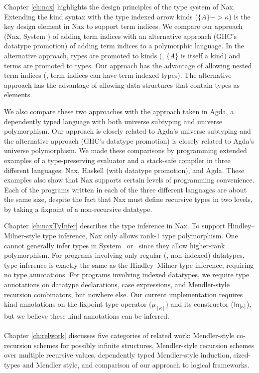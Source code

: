 Chapter \ref{ch:nax} highlights the design principles of the type system of Nax.
Extending the kind syntax with the type indexed arrow kinds ($\{A\} -> \kappa$) 
is the key design element in Nax to support term indices.
We compare our approach (Nax, System \Fi) of adding term indices with
an alternative approach (GHC's datatype promotion) of adding
term indices to a polymorphic language. In the alternative approach,
types are promoted to kinds (\ie, $\{A\}$ is itself a kind) and
terms are promoted to types. Our approach has the advantage of
allowing nested term indices (\ie, term indices can have term-indexed types).
The alternative approach has the advantage of allowing data structures that
contain types as elements.

We also compare these two approaches with the approach taken in Agda,
a dependently typed language with both universe subtyping and
universe polymorphism. Our approach is closely related to
Agda's universe subtyping and the alternative approach
(GHC's datatype promotion) is closely related to Agda's universe polymorphism.
We made these comparisons by programming extended examples of
a type-preserving evaluator and a stack-safe compiler
in three different languages: Nax, Haskell (with datatype promotion), and Agda.
These examples also show that Nax supports certain levels of
programming convenience. Each of the programs written
in each of the three different languages are about the same size,
despite the fact that Nax must define recursive types in two levels,
by taking a fixpoint of a non-recursive datatype.

Chapter \ref{ch:naxTyInfer} describes the type inference in Nax. To support
Hindley--Milner-style type inference, Nax only allows rank-1 type polymorphism.
One cannot generally infer types in System \Fi\ or \Fixi\ since they allow
higher-rank polymorphism. For programs involving only regular (\ie, non-indexed)
datatypes, type inference is exactly the same as the Hindley--Milner
type inference, requiring no type annotations. For programs involving
indexed datatypes, we require type annotations on datatype declarations,
case expressions, and Mendler-style recursion combinators, but nowhere else.
Our current implementation requires kind annotations on
the fixpoint type operator ($\mu_{[\kappa]}$) and its constructor
($\mathsf{In}_{[\kappa]}$), but we believe these kind annotations can be inferred.

\paragraph{}
Chapter \ref{ch:relwork} discusses five categories of related work:
Mendler-style co-recursion schemes for possibly infinite structures,
Mendler-style recursion schemes over multiple recursive values,
dependently typed Mendler-style induction, sized-types and Mendler style,
and comparison of our approach to logical frameworks.

